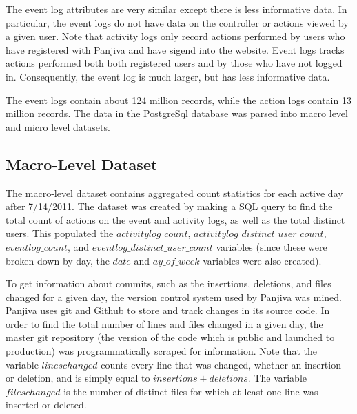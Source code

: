 \documentclass[12pt]{article}
\begin{document}
The event log attributes are very similar except there is less informative data. In particular, the event logs do not have data on the controller or actions viewed by a given user. Note that activity logs only record actions performed by users who have registered with Panjiva and have sigend into the website. Event logs tracks actions performed both both registered users and by those who have not logged in. Consequently, the event log is much larger, but has less informative data.

The event logs contain about 124 million records, while the action logs contain 13 million records. The data in the PostgreSql database was parsed into macro level and micro level datasets. 

\subsection{Macro-Level Dataset}

The macro-level dataset contains aggregated count statistics for each active day after 7/14/2011. The dataset was created by making a SQL query to find the total count of actions on the event and activity logs, as well as the total distinct users. This populated the $activitylog\_count$, $activitylog\_distinct\_user\_count$, $eventlog\_count$, and $eventlog\_distinct\_user\_count$ variables (since these were broken down by day, the $date$ and $ay\_of\_week$ variables were also created). 

To get information about commits, such as the insertions, deletions, and files changed for a given day, the version control system used by Panjiva was mined. Panjiva uses git and Github to store and track changes in its source code. In order to find the total number of lines and files changed in a given day, the master git repository (the version of the code which is public and launched to production) was programmatically scraped for information. Note that the variable $lineschanged$ counts every line that was changed, whether an insertion or deletion, and is simply equal to $insertions + deletions$. The variable $fileschanged$ is the number of distinct files for which at least one line was inserted or deleted. 
\end{document}
